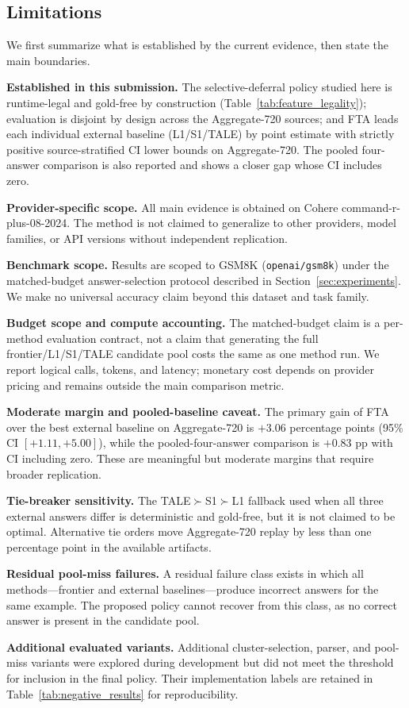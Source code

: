 \subsection{Limitations}
\label{sec:limitations}

We first summarize what is established by the current evidence, then state the main boundaries.

\medskip\noindent\textbf{Established in this submission.}
The selective-deferral policy studied here is runtime-legal and gold-free by
construction (Table~\ref{tab:feature_legality}); evaluation is disjoint by design
across the Aggregate-720 sources; and FTA leads each individual external baseline
(L1/S1/TALE) by point estimate with strictly positive source-stratified CI lower
bounds on Aggregate-720. The pooled four-answer comparison is also reported and
shows a closer gap whose CI includes zero.

\medskip\noindent\textbf{Provider-specific scope.}
All main evidence is obtained on Cohere command-r-plus-08-2024. The method is not claimed to generalize to other providers, model families, or API versions without independent replication.

\medskip\noindent\textbf{Benchmark scope.}
Results are scoped to GSM8K (\texttt{openai/gsm8k}) under the matched-budget
answer-selection protocol described in Section~\ref{sec:experiments}. We make no
universal accuracy claim beyond this dataset and task family.

\medskip\noindent\textbf{Budget scope and compute accounting.}
The matched-budget claim is a per-method evaluation contract, not a claim that generating the full frontier/L1/S1/TALE candidate pool costs the same as one method run. We report logical calls, tokens, and latency; monetary cost depends on provider pricing and remains outside the main comparison metric.

\medskip\noindent\textbf{Moderate margin and pooled-baseline caveat.}
The primary gain of FTA over the best external baseline on Aggregate-720 is $+3.06$ percentage points (95\% CI $[+1.11, +5.00]$), while the pooled-four-answer comparison is $+0.83$ pp with CI including zero. These are meaningful but moderate margins that require broader replication.

\medskip\noindent\textbf{Tie-breaker sensitivity.}
The TALE$\succ$S1$\succ$L1 fallback used when all three external answers differ is deterministic and gold-free, but it is not claimed to be optimal. Alternative tie orders move Aggregate-720 replay by less than one percentage point in the available artifacts.

\medskip\noindent\textbf{Residual pool-miss failures.}
A residual failure class exists in which all methods---frontier and external baselines---produce incorrect answers for the same example. The proposed policy cannot recover from this class, as no correct answer is present in the candidate pool.

\medskip\noindent\textbf{Additional evaluated variants.}
Additional cluster-selection, parser, and pool-miss variants were explored during development but did not meet the threshold for inclusion in the final policy. Their implementation labels are retained in Table~\ref{tab:negative_results} for reproducibility.
